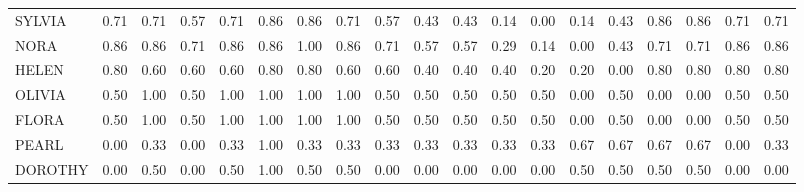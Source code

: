 \begin{table}[!h]
{\begin{tabular}[t]{lrrrrrrrrrrrrrrrrrr}
SYLVIA & 0.71 & 0.71 & 0.57 & 0.71 & 0.86 & 0.86 & 0.71 & 0.57 & 0.43 & 0.43 & 0.14 & 0.00 & 0.14 & 0.43 & 0.86 & 0.86 & 0.71 & 0.71\\
NORA & 0.86 & 0.86 & 0.71 & 0.86 & 0.86 & 1.00 & 0.86 & 0.71 & 0.57 & 0.57 & 0.29 & 0.14 & 0.00 & 0.43 & 0.71 & 0.71 & 0.86 & 0.86\\
HELEN & 0.80 & 0.60 & 0.60 & 0.60 & 0.80 & 0.80 & 0.60 & 0.60 & 0.40 & 0.40 & 0.40 & 0.20 & 0.20 & 0.00 & 0.80 & 0.80 & 0.80 & 0.80\\
OLIVIA & 0.50 & 1.00 & 0.50 & 1.00 & 1.00 & 1.00 & 1.00 & 0.50 & 0.50 & 0.50 & 0.50 & 0.50 & 0.00 & 0.50 & 0.00 & 0.00 & 0.50 & 0.50\\
FLORA & 0.50 & 1.00 & 0.50 & 1.00 & 1.00 & 1.00 & 1.00 & 0.50 & 0.50 & 0.50 & 0.50 & 0.50 & 0.00 & 0.50 & 0.00 & 0.00 & 0.50 & 0.50\\
PEARL & 0.00 & 0.33 & 0.00 & 0.33 & 1.00 & 0.33 & 0.33 & 0.33 & 0.33 & 0.33 & 0.33 & 0.33 & 0.67 & 0.67 & 0.67 & 0.67 & 0.00 & 0.33\\
DOROTHY & 0.00 & 0.50 & 0.00 & 0.50 & 1.00 & 0.50 & 0.50 & 0.00 & 0.00 & 0.00 & 0.00 & 0.00 & 0.50 & 0.50 & 0.50 & 0.50 & 0.00 & 0.00\\
\bottomrule
\end{tabular}}
\end{table}
